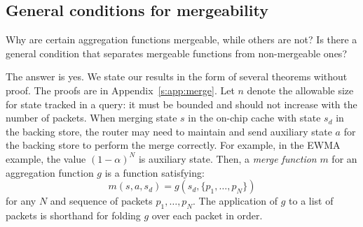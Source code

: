 \subsection{General conditions for mergeability}

Why are certain aggregation functions mergeable, while others are not? Is there
a general condition that separates mergeable functions from non-mergeable ones?

The answer is yes.
We state our results in the form of several theorems without proof. The proofs
are in Appendix~\ref{s:app:merge}.
Let $n$ denote the allowable size for state tracked in a \TheSystem query: it must be bounded
and should not increase with the number of packets.
When merging state $s$ in the on-chip cache with state $s_d$ in the
backing store, the router may
need to maintain and send auxiliary state $a$ for the backing store to perform
the merge correctly. For example, in the EWMA example, the value $(1-\alpha)^N$
is auxiliary state. Then, a \emph{merge function} $m$ for an aggregation
function $g$ is a function
satisfying:
\[ m(s, a, s_d) = g(s_d, \{p_1, \ldots, p_N\}) \]
for any $N$ and sequence of packets $p_1, \ldots, p_N$. The application of $g$ to
a list of packets is shorthand for folding $g$ over each packet in order.

